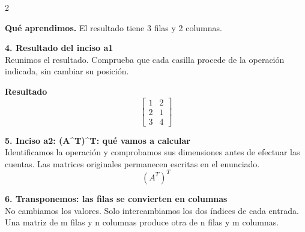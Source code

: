 \documentclass[11pt,a4paper,landscape]{article}
\begin{document}
\begin{multicols*}{2}
\begin{minipage}{\linewidth}
\par\smallskip\textbf{Qué aprendimos.} El resultado tiene 3 filas y 2 columnas.
\end{minipage}\par\medskip
\noindent\begin{minipage}{\linewidth}\textbf{4. Resultado del inciso a1}\\[2pt]Reunimos el resultado. Comprueba que cada casilla procede de la operación indicada, sin cambiar su posición.
\par\smallskip \textbf{Resultado}\[\begin{bmatrix}1 & 2\\2 & 1\\3 & 4\end{bmatrix}\]
\end{minipage}\par\medskip
\noindent\begin{minipage}{\linewidth}\textbf{5. Inciso a2: (A\textasciicircum{}T)\textasciicircum{}T: qué vamos a calcular}\\[2pt]Identificamos la operación y comprobamos sus dimensiones antes de efectuar las cuentas. Las matrices originales permanecen escritas en el enunciado.
\[(A^T)^T\]
\end{minipage}\par\medskip
\noindent\begin{minipage}{\linewidth}\textbf{6. Transponemos: las filas se convierten en columnas}\\[2pt]No cambiamos los valores. Solo intercambiamos los dos índices de cada entrada. Una matriz de m filas y n columnas produce otra de n filas y m columnas.
\par{}\par\smallskip

\end{minipage}
\end{multicols*}
\end{document}
